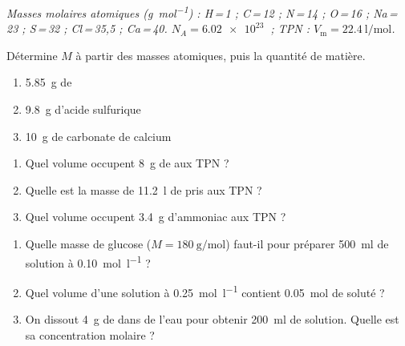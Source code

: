 \documentclass[11pt,a4paper]{article}
\begin{document}
\begin{center}\small\itshape
Masses molaires atomiques (\si{\gram\per\mole}) : H\,=\,1 ; C\,=\,12 ; N\,=\,14 ; O\,=\,16 ;
Na\,=\,23 ; S\,=\,32 ; Cl\,=\,35,5 ; Ca\,=\,40. \quad $N_A=\qty{6.02e23}{}$ ; TPN : $V_{\mathrm{m}}=\qty{22.4}{\litre\per\mole}$.
\end{center}

\begin{exo}
Détermine $M$ à partir des masses atomiques, puis la quantité de matière.
\begin{enumerate}[label=\alph*)]
  \item \qty{5.85}{\gram} de 
  \item \qty{9.8}{\gram} d'acide sulfurique 
  \item \qty{10}{\gram} de carbonate de calcium 
\end{enumerate}
\end{exo}

\begin{exo}
\begin{enumerate}[label=\alph*)]
  \item Quel volume occupent \qty{8}{\gram} de  aux TPN ?
  \item Quelle est la masse de \qty{11.2}{\litre} de  pris aux TPN ?
  \item Quel volume occupent \qty{3.4}{\gram} d'ammoniac  aux TPN ?
\end{enumerate}
\end{exo}

\begin{exo}
\begin{enumerate}[label=\alph*)]
  \item Quelle masse de glucose  ($M=\qty{180}{\gram\per\mole}$) faut-il pour préparer
        \qty{500}{\milli\litre} de solution à \qty{0.10}{\mole\per\litre} ?
  \item Quel volume d'une solution à \qty{0.25}{\mole\per\litre} contient \qty{0.05}{\mole} de soluté ?
  \item On dissout \qty{4}{\gram} de  dans de l'eau pour obtenir \qty{200}{\milli\litre} de
        solution. Quelle est sa concentration molaire ?
\end{enumerate}
\end{exo}
\end{document}
